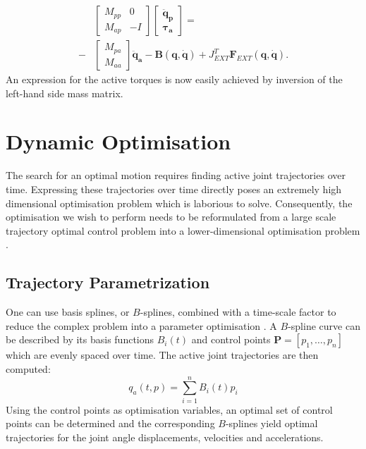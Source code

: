 \documentclass[letterpaper, 10 pt, conference]{ieeeconf}  %
\begin{document}
\begin{equation}
\begin{aligned}
&\left[\begin{array}{cc}  
M_{pp} & 0\\
M_{ap} &-I
\end{array} \right]
\left[\begin{array}{c}  
\mathbf{\ddot q_p}\\
\boldsymbol{\tau_a}
\end{array} \right] =\\ 
-&
\left[\begin{array}{c}  
M_{pa}\\
M_{aa}
\end{array} \right] 
\mathbf{\ddot q_a}-
\mathbf{B(q, \dot q)}+
J_{EXT}^T\mathbf{F}_{EXT}\mathbf{(q, \dot q)}.
\end{aligned}
\end{equation}	
An expression for the active torques is now easily achieved by inversion of the left-hand side mass matrix. 

\section{Dynamic Optimisation} \label{sec:dynamicOptimisation}

The search for an optimal motion requires finding active joint trajectories over time. Expressing these trajectories over time directly poses an extremely high dimensional optimisation problem which is laborious to solve. Consequently, the optimisation we wish to perform needs to be reformulated from a large scale trajectory optimal control problem into a lower-dimensional optimisation problem \cite{kaphle2008optimality}.


\subsection{Trajectory Parametrization}

One can use basis splines, or $B$-splines, combined with a time-scale factor to reduce the complex problem into a parameter optimisation \cite{ude2000planning,babivc2009biarticulated,wang1999weight,albro2001optimal}. A $B$-spline curve can be described by its basis functions $B_i(t)$ and control points $\mathbf{P}=\left[p_1,\dots,p_n\right]$ which are evenly spaced over time. The active joint trajectories are then computed:   
 \begin{equation}
q_a(t,p) = \sum_{i=1}^{n} B_i (t) p_i
\end{equation}
Using the control points as optimisation variables, an optimal set of control points can be determined and the corresponding $B$-splines yield optimal trajectories for the joint angle displacements, velocities and accelerations. 
\end{document}
